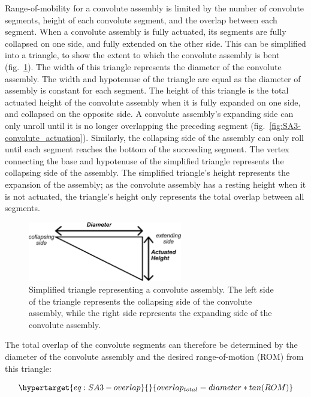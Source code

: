 \documentclass[defaultstyle,11pt]{comps}
\begin{document}
Range-of-mobility for a convolute assembly is limited by the number of convolute segments, height of each convolute segment, and the overlap between each segment.
When a convolute assembly is fully actuated, its segments are fully collapsed on one side, and fully extended on the other side.
This can be simplified into a triangle, to show the extent to which the convolute assembly is bent (fig.~\ref{fig:SA3-convolute_tri}).
The width of this triangle represents the diameter of the convolute assembly.
The width and hypotenuse of the triangle are equal as the diameter of assembly is constant for each segment.
The height of this triangle is the total actuated height of the convolute assembly when it is fully expanded on one side, and collapsed on the opposite side.
A convolute assembly's expanding side can only unroll until it is no longer overlapping the preceding segment (fig.~\ref{fig:SA3-convolute_actuation}).
Similarly, the collapsing side of the assembly can only roll until each segment reaches the bottom of the succeeding segment.
The vertex connecting the base and hypotenuse of the simplified triangle represents the collapsing side of the assembly.
The simplified triangle's height represents the expansion of the assembly; as the convolute assembly has a resting height when it is not actuated, the triangle's height only represents the total overlap between all segments.

\begin{figure}
\hypertarget{fig:SA3-convolute_tri}{%
\centering
\includegraphics[width=0.6\textwidth,height=\textheight]{../fig/SA3/Convolute_Triangle.png}
\caption{Simplified triangle representing a convolute assembly. The left side of the triangle represents the collapsing side of the convolute assembly, while the right side represents the expanding side of the convolute assembly.}\label{fig:SA3-convolute_tri}
}
\end{figure}

The total overlap of the convolute segments can therefore be determined by the diameter of the convolute assembly and the desired range-of-motion (ROM) from this triangle:

\begin{equation}\protect\hypertarget{eq:SA3-overlap}{}{
overlap_{total} = diameter*tan(ROM)
}\label{eq:SA3-overlap}\end{equation}
\end{document}
